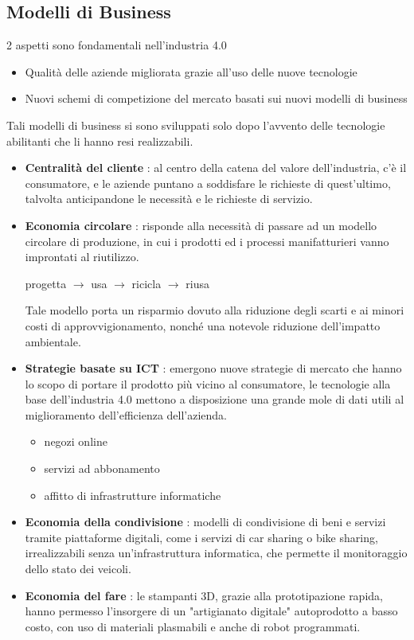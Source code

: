 \documentclass[10pt, letterpaper]{report}
\begin{document}
\subsection{Modelli di Business}
2 aspetti sono fondamentali nell'industria 4.0\begin{itemize}
    \item Qualità delle aziende migliorata grazie all'uso delle nuove tecnologie 
    \item Nuovi schemi di competizione del mercato basati sui nuovi modelli di business 
\end{itemize}
Tali modelli di business si sono sviluppati solo dopo l'avvento delle tecnologie abilitanti che li hanno resi 
realizzabili.\begin{itemize}
    \item \textbf{Centralità del cliente} : al centro della catena del valore dell'industria, c'è  il  consumatore, e le aziende puntano a soddisfare le richieste di quest'ultimo, talvolta anticipandone le necessità e le 
    richieste di servizio.
    \item \textbf{Economia circolare} : risponde alla necessità di passare ad un modello circolare di produzione, in 
    cui i prodotti ed i processi manifatturieri vanno improntati al riutilizzo.\begin{center}
        progetta $\longrightarrow$ usa $\longrightarrow$ ricicla $\longrightarrow$ riusa
    \end{center}
    Tale modello porta un risparmio dovuto alla riduzione degli scarti e ai minori costi di approvvigionamento, nonché 
    una notevole riduzione dell'impatto ambientale.
    \item \textbf{Strategie basate su ICT} : emergono nuove strategie di mercato che hanno lo scopo di portare il prodotto 
    più vicino al consumatore, le tecnologie alla base dell'industria 4.0 mettono a disposizione una grande mole di dati 
    utili al miglioramento dell'efficienza dell'azienda. \begin{itemize}
        \item negozi online 
        \item servizi ad abbonamento 
        \item affitto di infrastrutture informatiche 
    \end{itemize}
    \item \textbf{Economia della condivisione} : modelli di condivisione di beni e servizi tramite piattaforme digitali, come 
    i servizi di car sharing o bike sharing, irrealizzabili senza un'infrastruttura informatica, che permette il monitoraggio 
    dello stato dei veicoli.
    \item \textbf{Economia del fare} : le stampanti 3D, grazie alla prototipazione rapida, hanno permesso l'insorgere di un "artigianato digitale" 
    autoprodotto a basso costo, con uso di materiali  plasmabili e anche di robot programmati.
\end{itemize}
\end{document}
